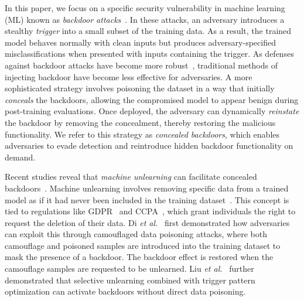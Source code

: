 In this paper, we focus on a specific security vulnerability in machine learning (ML) known as \textit{backdoor attacks}~\cite{trojannn,sig,badnets,refool,inputaware,blind,lira,ssba,wanet,lf,ftrojan,bppattack,poisonink}. In these attacks, an adversary introduces a stealthy \textit{trigger} into a small subset of the training data. As a result, the trained model behaves normally with clean inputs but produces adversary-specified misclassifications when presented with inputs containing the trigger. As defenses against backdoor attacks have become more robust~\cite{strip,nc,beatrix,ac,DBLP:conf/date/Alam0M24,DBLP:journals/tai/WangLSSMJ24,DBLP:journals/dt/SarkarAM20,sau,npd}, traditional methods of injecting backdoor have become less effective for adversaries. A more sophisticated strategy involves poisoning the dataset in a way that initially \textit{conceals} the backdoors, allowing the compromised model to appear benign during post-training evaluations. Once deployed, the adversary can dynamically \textit{reinstate} the backdoor by removing the concealment, thereby restoring the malicious functionality. We refer to this strategy as \textit{concealed backdoors}, which enables adversaries to evade detection and reintroduce hidden backdoor functionality on demand.

Recent studies reveal that \textit{machine unlearning} can facilitate concealed backdoors~\cite{DBLP:conf/nips/DiDA0S23,DBLP:conf/aaai/LiuWHM24}. Machine unlearning involves removing specific data from a trained model as if it had never been included in the training dataset~\cite{firstunlearning,sisa}. This concept is tied to regulations like GDPR~\cite{gdpr} and CCPA~\cite{ccpa}, which grant individuals the right to request the deletion of their data. Di \textit{et al.}~\cite{DBLP:conf/nips/DiDA0S23} first demonstrated how adversaries can exploit this through camouflaged data poisoning attacks, where both camouflage and poisoned samples are introduced into the training dataset to mask the presence of a backdoor. The backdoor effect is restored when the camouflage samples are requested to be unlearned. Liu \textit{et al.}~\cite{DBLP:conf/aaai/LiuWHM24} further demonstrated that selective unlearning combined with trigger pattern optimization can activate backdoors without direct data poisoning.

